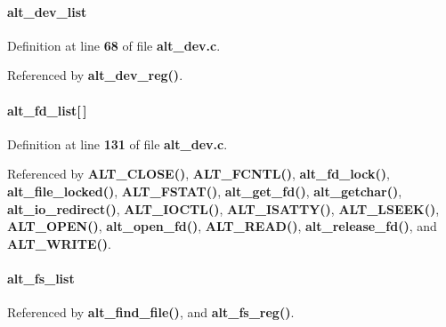 \paragraph[{alt\+\_\+dev\+\_\+list}]{ alt\+\_\+dev\+\_\+list}\label{alt__file_8h_a39bed231770a966001ae9f4cd2ce4074}


Definition at line {\bf 68} of file {\bf alt\+\_\+dev.\+c}.



Referenced by {\bf alt\+\_\+dev\+\_\+reg()}.

\paragraph[{alt\+\_\+fd\+\_\+list}]{ alt\+\_\+fd\+\_\+list[$\,$]}\label{alt__file_8h_aeb233a450b991f48b21139adfcb89153}


Definition at line {\bf 131} of file {\bf alt\+\_\+dev.\+c}.



Referenced by {\bf A\+L\+T\+\_\+\+C\+L\+O\+S\+E()}, {\bf A\+L\+T\+\_\+\+F\+C\+N\+T\+L()}, {\bf alt\+\_\+fd\+\_\+lock()}, {\bf alt\+\_\+file\+\_\+locked()}, {\bf A\+L\+T\+\_\+\+F\+S\+T\+A\+T()}, {\bf alt\+\_\+get\+\_\+fd()}, {\bf alt\+\_\+getchar()}, {\bf alt\+\_\+io\+\_\+redirect()}, {\bf A\+L\+T\+\_\+\+I\+O\+C\+T\+L()}, {\bf A\+L\+T\+\_\+\+I\+S\+A\+T\+T\+Y()}, {\bf A\+L\+T\+\_\+\+L\+S\+E\+E\+K()}, {\bf A\+L\+T\+\_\+\+O\+P\+E\+N()}, {\bf alt\+\_\+open\+\_\+fd()}, {\bf A\+L\+T\+\_\+\+R\+E\+A\+D()}, {\bf alt\+\_\+release\+\_\+fd()}, and {\bf A\+L\+T\+\_\+\+W\+R\+I\+T\+E()}.

\paragraph[{alt\+\_\+fs\+\_\+list}]{ alt\+\_\+fs\+\_\+list}\label{alt__file_8h_a10012e4d88a121b82154d9f377cee46d}


Referenced by {\bf alt\+\_\+find\+\_\+file()}, and {\bf alt\+\_\+fs\+\_\+reg()}.

